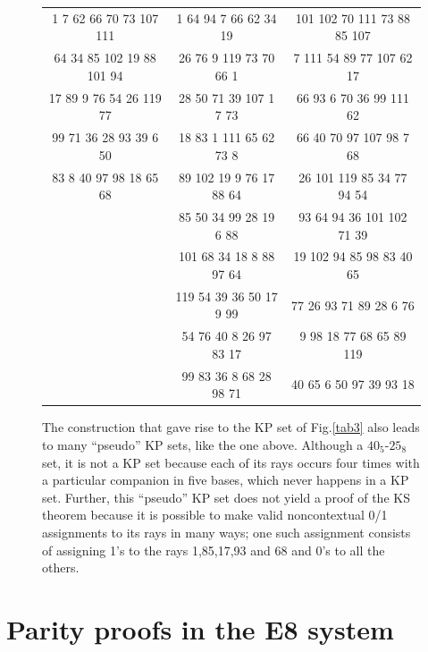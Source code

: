 \begin{figure}[ht]
\centering %
\begin{tabular}{|c | c |c |} %
\hline %
1	7	62	66	70	73	107	111	&	1	64	94	7	66	62	34	19	&	101	102	70	111	73	88	85	107 \\
64	34	85	102	19	88	101	94	&	26	76	9	119	73	70	66	1	&	7	111	54	89	77	107	62	17 \\
17	89	9	76	54	26	119	77	&	28	50	71	39	107	1	7	73	&	66	93	6	70	36	99	111	62 \\
99	71	36	28	93	39	6	50	&	18	83	1	111	65	62	73	8	&	66	40	70	97	107	98	7	68 \\
83	8	40	97	98	18	65	68	&	89	102	19	9	76	17	88	64	&	26	101	119	85	34	77	94	54 \\
								&	85	50	34	99	28	19	6	88	&	93	64	94	36	101	102	71	39 \\
								&	101	68	34	18	8	88	97	64	&	19	102	94	85	98	83	40	65 \\
								&	119	54	39	36	50	17	9	99	&	77	26	93	71	89	28	6	76 \\
								&	54	76	40	8	26	97	83	17	&	9	98	18	77	68	65	89	119 \\
								&	99	83	36	8	68	28	98	71	&	40	65	6	50	97	39	93	18 \\

\hline
\end{tabular}
\caption{The construction that gave rise to the KP set of Fig.\ref{tab3} also leads to many ``pseudo'' KP sets, like the one above. Although a $40_{5}$-$25_{8}$ set, it is not a KP set because each of its rays occurs four times with a particular companion in five bases, which never happens in a KP set. Further, this ``pseudo'' KP set does not yield a proof of the KS theorem because it is possible to make valid noncontextual 0/1 assignments to its rays in many ways; one such assignment consists of assigning 1's to the rays 1,85,17,93 and 68 and 0's to all the others.}
\label{tab3b}
\end{figure}

\section{\label{sec:4}Parity proofs in the E8 system}

